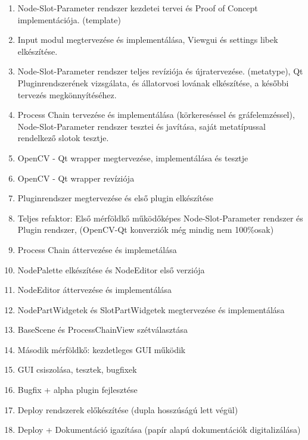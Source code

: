 \documentclass[a4paper,12pt,oneside]{report}
\begin{document}
\begin{enumerate}
\itemsep0em
\item Node-Slot-Parameter rendszer kezdetei tervei és Proof of Concept implementációja. (template)
\item Input modul megtervezése és implementálása, Viewgui és settings libek elkészítése.
\item Node-Slot-Parameter rendszer teljes revíziója és újratervezése. (metatype), Qt Pluginrendszerének vizsgálata, és állatorvosi lovának elkészítése, a későbbi tervezés megkönnyítéséhez.
\item Process Chain tervezése és implementálása (körkereséssel és gráfelemzéssel), Node-Slot-Parameter rendszer tesztei és javítása, saját metatípussal rendelkező slotok tesztje.
\item OpenCV - Qt wrapper megtervezése, implementálása és tesztje
\item OpenCV - Qt wrapper revíziója
\item Pluginrendszer megtervezése és első plugin elkészítése
\item Teljes refaktor: Első mérföldkő működőképes Node-Slot-Parameter rendszer és Plugin rendszer, (OpenCV-Qt konverziók még mindig nem 100\%osak)
\item Process Chain áttervezése és implemetálása
\item NodePalette elkészítése és NodeEditor első verziója
\item NodeEditor áttervezése és implementálása
\item NodePartWidgetek és SlotPartWidgetek megtervezése és implementálása
\item BaseScene és ProcessChainView szétválasztása
\item Második mérföldkő: kezdetleges GUI működik
\item GUI csiszolása, tesztek, bugfixek
\item Bugfix + alpha plugin fejlesztése
\item Deploy rendszerek előkészítése (dupla hosszúságú lett végül)
\item Deploy + Dokumentáció igazítása (papír alapú dokumentációk digitalizálása)

\end{enumerate}
\end{document}
